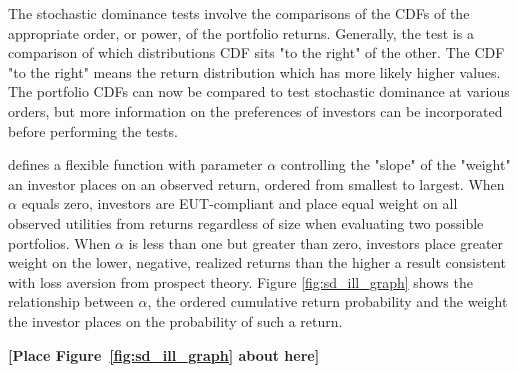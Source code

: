 %		
%	
%		
%	
%		
%	
%		
The stochastic dominance tests involve the comparisons of the CDFs of the appropriate order, or power, of the portfolio returns. Generally, the test is a comparison of which distributions CDF sits "to the right" of the other. The CDF "to the right" means the return distribution which has more likely higher values. The portfolio CDFs can now be compared to test stochastic dominance at various orders, but more information on the preferences of investors can be incorporated before performing the tests.

\citet{prelec_probability_1998} defines a flexible function with parameter $\alpha$ controlling the "slope" of the "weight" an investor places on an observed return, ordered from smallest to largest. When $\alpha$ equals zero, investors are EUT-compliant and place equal weight on all observed utilities from returns regardless of size when evaluating two possible portfolios. When $\alpha$ is less than one but greater than zero, investors place greater weight on the lower, negative, realized returns than the higher a result consistent with loss aversion from prospect theory. Figure \ref{fig:sd_ill_graph} shows the relationship between $\alpha$, the ordered cumulative return probability and the weight the investor places on the probability of such a return.
\bigskip
\centerline{\bf [Place Figure~\ref{fig:sd_ill_graph} about here]}
\bigskip

